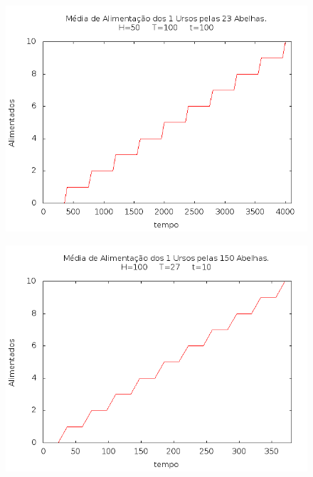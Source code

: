 \documentclass[12pt,a4paper]{article}
\begin{document}
\begin{figure}[!htb]
\centering
\includegraphics[width=0.7\paperwidth]{./graficos/ursos_23_1_50_100_100.png}
\label{Rotulo}
\end{figure}

\begin{figure}[!htb]
\centering
\includegraphics[width=0.7\paperwidth]{./graficos/ursos_150_1_100_10_27.png}
\label{Rotulo}
\end{figure}
\end{document}
